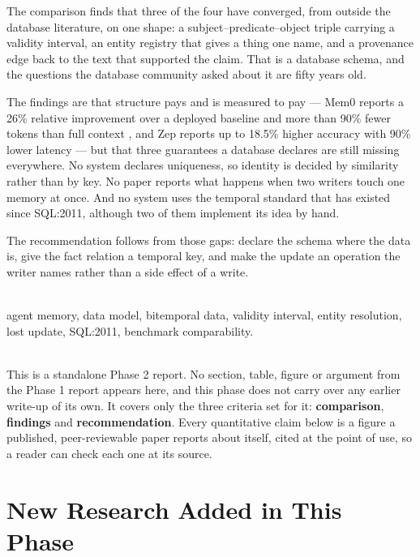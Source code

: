 \documentclass[11pt,a4paper]{article}
\newcommand{\eyebrow}[1]{{\sffamily\footnotesize\bfseries\color{clay700}%
  \MakeUppercase{\textls[140]{#1}}}}
\begin{document}
The comparison finds that three of the four have converged, from outside
the database literature, on one shape: a subject--predicate--object
triple carrying a validity interval, an entity registry that gives a
thing one name, and a provenance edge back to the text that supported the
claim. That is a database schema, and the questions the database
community asked about it are fifty years old.

The findings are that structure pays and is measured to pay --- Mem0
reports a 26\% relative improvement over a deployed baseline and more
than 90\% fewer tokens than full context \cite{mem0}, and Zep reports up
to 18.5\% higher accuracy with 90\% lower latency \cite{zep} --- but that
three guarantees a database declares are still missing everywhere. No
system declares uniqueness, so identity is decided by similarity rather
than by key. No paper reports what happens when two writers touch one
memory at once. And no system uses the temporal standard that has existed
since SQL:2011, although two of them implement its idea by hand.

The recommendation follows from those gaps: declare the schema where the
data is, give the fact relation a temporal key, and make the update an
operation the writer names rather than a side effect of a write.

\vspace{0.4\baselineskip}
\eyebrow{Keywords}\\[2pt]
agent memory, data model, bitemporal data, validity interval, entity
resolution, lost update, SQL:2011, benchmark comparability.

\clearpage

{\setlength{\fboxsep}{9pt}%
\colorbox{clay100}{\parbox{\dimexpr\textwidth-18pt\relax}{\small
\eyebrow{What this report does not repeat}\\[3pt]
This is a standalone Phase 2 report. No section, table, figure or
argument from the Phase 1 report appears here, and this phase does not
carry over any earlier write-up of its own. It covers only the three
criteria set for it: \textbf{comparison}, \textbf{findings} and
\textbf{recommendation}. Every quantitative claim below is a figure a
published, peer-reviewable paper reports about itself, cited at the point
of use, so a reader can check each one at its source.}}}

\vspace{0.6\baselineskip}

\section*{\sffamily\color{blue800}New Research Added in This Phase}
\end{document}
